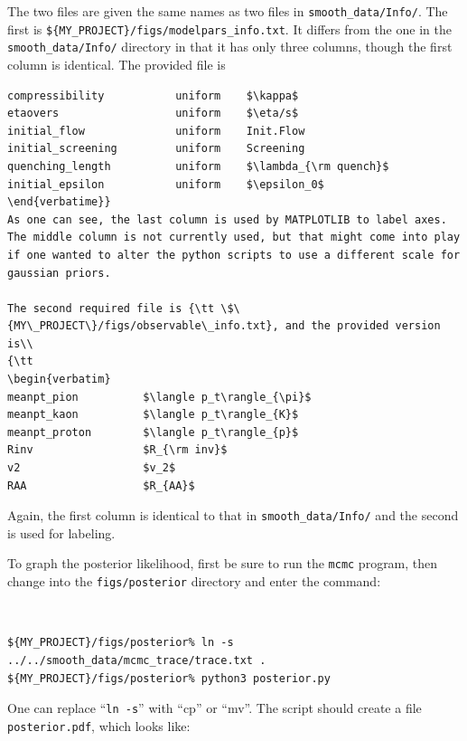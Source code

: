\documentclass[UserManual.tex]{subfiles}
\begin{document}
The two files are given the same names as two files in {\tt smooth\_data/Info/}. The first is {\tt \$\{MY\_PROJECT\}/figs/modelpars\_info.txt}. It differs from the one in the {\tt smooth\_data/Info/} directory in that it has only three columns, though the first column is identical. The provided file is\\
{\tt\begin{verbatim}
compressibility           uniform    $\kappa$
etaovers                  uniform    $\eta/s$
initial_flow              uniform    Init.Flow
initial_screening         uniform    Screening
quenching_length          uniform    $\lambda_{\rm quench}$
initial_epsilon           uniform    $\epsilon_0$
\end{verbatime}}
As one can see, the last column is used by MATPLOTLIB to label axes. The middle column is not currently used, but that might come into play if one wanted to alter the python scripts to use a different scale for gaussian priors.

The second required file is {\tt \$\{MY\_PROJECT\}/figs/observable\_info.txt}, and the provided version is\\
{\tt
\begin{verbatim}
meanpt_pion          $\langle p_t\rangle_{\pi}$
meanpt_kaon          $\langle p_t\rangle_{K}$
meanpt_proton        $\langle p_t\rangle_{p}$
Rinv                 $R_{\rm inv}$
v2                   $v_2$
RAA                  $R_{AA}$
\end{verbatim}}
Again, the first column is identical to that in {\tt smooth\_data/Info/} and the second is used for labeling.

To graph the posterior likelihood, first be sure to run the {\tt mcmc} program, then change into the {\tt figs/posterior} directory and enter the command:
{\tt
\begin{verbatim}
${MY_PROJECT}/figs/posterior% ln -s ../../smooth_data/mcmc_trace/trace.txt .
${MY_PROJECT}/figs/posterior% python3 posterior.py
\end{verbatim}}
One can replace ``{\tt ln -s}'' with ``cp'' or ``mv''. The script should create a file {\tt posterior.pdf}, which looks like:
\end{document}
